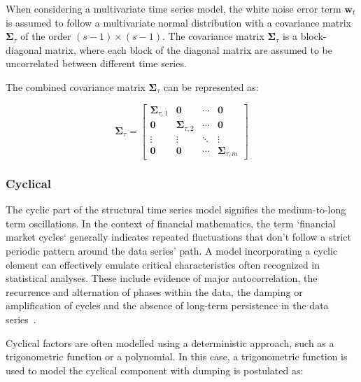     When considering a multivariate time series model, the white noise error term $\bm{w}_{t}$ is assumed to follow
    a multivariate normal distribution with a covariance matrix $\bm{\Sigma}_{\tau}$ of the order $(s-1) \times (s-1)$.
    The covariance matrix $\bm{\Sigma}_{\tau}$ is a block-diagonal matrix, where each block of the diagonal matrix are
    assumed to be uncorrelated between different time series.

    The combined covariance matrix $\bm{\Sigma}_{\tau}$ can be represented as:

    \begin{equation}
        \bm{\Sigma}_{\tau} =
            \left[
                \begin{array}{cccc}
                    \mathbf{\Sigma}_{\tau, 1} & \mathbf{0}                 & \cdots & \mathbf{0} \\
                    \mathbf{0}                & \mathbf{\Sigma}_{\tau, 2}  & \cdots & \mathbf{0} \\
                    \vdots                    & \vdots                     & \ddots & \vdots     \\
                    \mathbf{0}                & \mathbf{0}                 & \cdots & \mathbf{\Sigma}_{\tau, m}
                \end{array}
            \right]
    \label{eq:seasonal_covariance}
    \end{equation}

\subsubsection{Cyclical}
    \label{sec:cyclical_component}

    The cyclic part of the structural time series model signifies the medium-to-long term oscillations.
    In the context of financial mathematics, the term `financial market cycles` generally indicates repeated fluctuations
    that don't follow a strict periodic pattern around the data series' path.
    A model incorporating a cyclic element can effectively emulate critical characteristics often recognized in statistical analyses.
    These include evidence of major autocorrelation, the recurrence and alternation of phases within the data,
    the damping or amplification of cycles and the absence of long-term persistence in the data series~\cite{qiu_multivariate_2018}.

    Cyclical factors are often modelled using a deterministic approach, such as a trigonometric function or a polynomial.
    In this case, a trigonometric function is used to model the cyclical component with dumping is postulated as:


